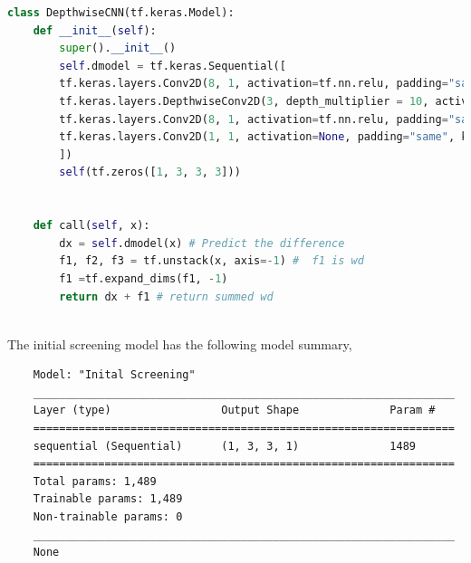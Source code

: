 \begin{lstlisting}[language=Python, label={lst:1}]
	class DepthwiseCNN(tf.keras.Model):
	def __init__(self):
		super().__init__()
		self.dmodel = tf.keras.Sequential([
		tf.keras.layers.Conv2D(8, 1, activation=tf.nn.relu, padding="same"),
		tf.keras.layers.DepthwiseConv2D(3, depth_multiplier = 10, activation=tf.nn.relu, padding="same"),
		tf.keras.layers.Conv2D(8, 1, activation=tf.nn.relu, padding="same"),
		tf.keras.layers.Conv2D(1, 1, activation=None, padding="same", kernel_initializer=tf.zeros_initializer)
		])
		self(tf.zeros([1, 3, 3, 3]))
	
	
	def call(self, x):
		dx = self.dmodel(x) # Predict the difference
		f1, f2, f3 = tf.unstack(x, axis=-1) #  f1 is wd
		f1 =tf.expand_dims(f1, -1)
		return dx + f1 # return summed wd
	
\end{lstlisting}
The initial screening model has the following model summary,

\begin{verbatim}
	Model: "Inital Screening"
	_________________________________________________________________
	Layer (type)                 Output Shape              Param #   
	=================================================================
	sequential (Sequential)      (1, 3, 3, 1)              1489      
	=================================================================
	Total params: 1,489
	Trainable params: 1,489
	Non-trainable params: 0
	_________________________________________________________________
	None
\end{verbatim}

